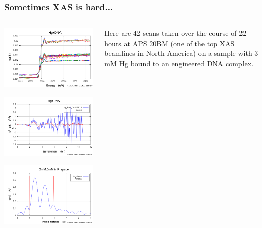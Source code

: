 \documentclass[10pt, xcolor=x11names, compress]{beamer}
\begin{document}
\begin{frame}
  \frametitle{Sometimes XAS is hard...}
  \begin{columns}
    \begin{column}{0.36\linewidth}
      \includegraphics[width=\linewidth]{images/hg_mu_stack.png}

      \includegraphics[width=\linewidth]{images/hg_chik.png}      

      \includegraphics[width=\linewidth]{../ATEA/info/hgdna_chir.png}
    \end{column}
    \begin{column}{0.60\linewidth}
      Here are 42 scans taken over the course of 22 hours at APS 20BM
      (one of the top XAS beamlines in North America) on a sample with
      3\,mM Hg bound to an engineered DNA complex.


\end{column}
\end{columns}
\end{frame}
\end{document}
